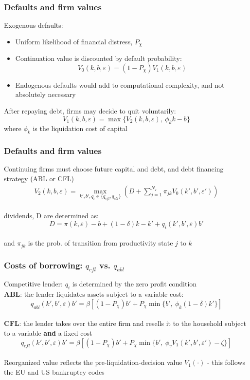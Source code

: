 \documentclass[notes]{beamer}
\begin{document}
\begin{frame}
\frametitle{Defaults and firm values}
Exogenous defaults:
\begin{itemize}
\item Uniform likelihood of financial distress, $P_\chi$ 
\item Continuation value is discounted by default probability: 
$$V_0(k,b,\varepsilon) = \left( 1 - P_\chi \right) V_1 (k,b,\varepsilon) $$
\item Endogenous defaults would add to computational complexity, and not absolutely necessary
\end{itemize} 
After repaying debt, firms may decide to quit voluntarily: 
$$ V_1(k,b,\varepsilon) = \max \Big\{  V_2(k,b,\varepsilon), \  \phi_k k - b \Big\} $$ 
where $\phi_k$ is the liquidation cost of capital
\end{frame}


\begin{frame}
\frametitle{Defaults and firm values}
Continuing firms must choose future capital and debt, and debt financing strategy (ABL or CFL) \\
\begin{align*}
V_2(k,b,\varepsilon) =  \max_{k',b', q_i \in \{q_{cfl}, q_{abl}\}}  \left( D +  \sum_{j=1}^{N_\varepsilon} \pi_{jk} V_0(k',b',\varepsilon') \right)
\end{align*} \vspace{2mm} \\
dividends, D are determined as: 
$$ D = \pi(k,\varepsilon)-b +(1-\delta)k - k'+q_i(k',b',\varepsilon)b' $$ \vspace{1mm} \\
and $\pi_{jk}$ is the prob. of transition from productivity state $j$ to $k$
\end{frame}


\begin{frame}[label = ABLCFL] 
\frametitle{Costs of borrowing: $q_{cfl}$ vs. $q_{abl}$}
Competitive lender: $q_i$ is determined by the zero profit condition  \vspace{5mm} \\
\textbf{ABL}: the lender liquidates assets subject to a variable cost:
$$ q_{abl}(k',b',\varepsilon)b' = \beta \left[ (1-P_\chi) b' + P_\chi \min\{b', \ \phi_k (1-\delta) k' \} \right]  $$ \vspace{1mm} \\
\textbf{CFL}: the lender takes over the entire firm and resells it to the household subject to a variable \textbf{and} a fixed cost 
$$ q_{cfl}(k',b',\varepsilon)b' = \beta \left[ (1-P_\chi) b' + P_\chi \min\{b', \ \phi_v V_1(k',b',\varepsilon') - \zeta \} \right]  $$ \vspace{1mm} \\
Reorganized value reflects the pre-liquidation-decision value $V_1(\cdot)$ - this follows the EU and US bankruptcy codes
\begin{center}
\hyperlink{zeta}{} 
\end{center}

\end{frame}
\end{document}

